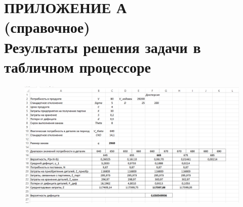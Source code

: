 \renewcommand{\thefigure}{\Asbuk{section}.\arabic{figure}}
\renewcommand{\thetable}{\Asbuk{section}.\arabic{table}}
\renewcommand{\thelstlisting}{\Asbuk{section}.\arabic{lstlisting}}

\pagestyle{fancy}
\fancyhf{} %
\fancyfoot[R]{\thepage}
\renewcommand{\headrulewidth}{0pt}
\renewcommand{\footrulewidth}{0pt}

\setlength{\headheight}{10mm}
\setlength{\headsep}{\baselineskip}

\section*{ПРИЛОЖЕНИЕ А\\(справочное)\\Результаты решения задачи в табличном процессоре}

\thispagestyle{plain}
\setcounter{section}{1}
\setcounter{figure}{0}
\setcounter{table}{0}
\setcounter{lstlisting}{0}

\begin{figure}[h!]
  \centering
  \includegraphics[width=150mm]{pic/lab_2}
\end{figure}